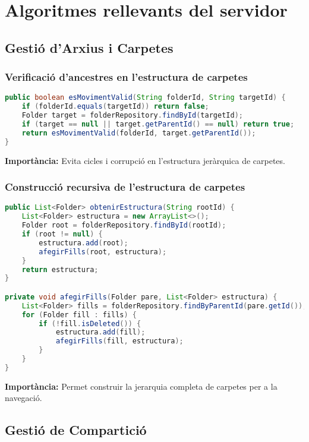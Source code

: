 
\chapter{Algoritmes rellevants del servidor}

\section{Gestió d'Arxius i Carpetes}

\subsection{Verificació d'ancestres en l'estructura de carpetes}
\begin{lstlisting}[language=Java]
public boolean esMovimentValid(String folderId, String targetId) {
    if (folderId.equals(targetId)) return false;
    Folder target = folderRepository.findById(targetId);
    if (target == null || target.getParentId() == null) return true;
    return esMovimentValid(folderId, target.getParentId());
}
\end{lstlisting}
\textbf{Importància:} Evita cicles i corrupció en l'estructura jeràrquica de carpetes.

\subsection{Construcció recursiva de l'estructura de carpetes}
\begin{lstlisting}[language=Java]
public List<Folder> obtenirEstructura(String rootId) {
    List<Folder> estructura = new ArrayList<>();
    Folder root = folderRepository.findById(rootId);
    if (root != null) {
        estructura.add(root);
        afegirFills(root, estructura);
    }
    return estructura;
}

private void afegirFills(Folder pare, List<Folder> estructura) {
    List<Folder> fills = folderRepository.findByParentId(pare.getId());
    for (Folder fill : fills) {
        if (!fill.isDeleted()) {
            estructura.add(fill);
            afegirFills(fill, estructura);
        }
    }
}
\end{lstlisting}
\textbf{Importància:} Permet construir la jerarquia completa de carpetes per a la navegació.

\section{Gestió de Compartició}

